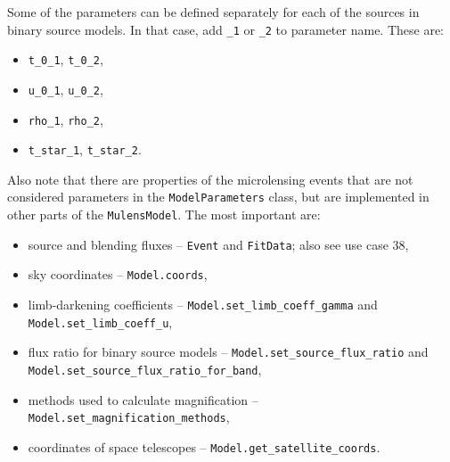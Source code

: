 \documentclass[12pt]{article}
\begin{document}
Some of the parameters can be defined separately for each of the sources in binary source models.  
In that case, add {\tt \_1} or {\tt \_2} to parameter name. These are:
\begin{itemize}
\item {\tt t\_0\_1}, {\tt t\_0\_2},
\item {\tt u\_0\_1}, {\tt u\_0\_2},
\item {\tt rho\_1}, {\tt rho\_2},
\item {\tt t\_star\_1}, {\tt t\_star\_2}.
\end{itemize}

Also note that there are properties of the microlensing events that are not considered parameters in the \texttt{ModelParameters} class, but are implemented in other parts of the \texttt{MulensModel}. The most important are:
\begin{itemize}
 \item source and blending fluxes -- \texttt{Event} and \texttt{FitData}; also see use case 38,
 \item sky coordinates -- \texttt{Model.coords},
 \item limb-darkening coefficients -- \texttt{Model.set\_limb\_coeff\_gamma} and \texttt{Model.set\_limb\_coeff\_u},
 \item flux ratio for binary source models -- \texttt{Model.set\_source\_flux\_ratio} and\\ \texttt{Model.set\_source\_flux\_ratio\_for\_band},
 \item methods used to calculate magnification -- \texttt{Model.set\_magnification\_methods},
 \item coordinates of space telescopes -- \texttt{Model.get\_satellite\_coords}.
\end{itemize}
\end{document}
